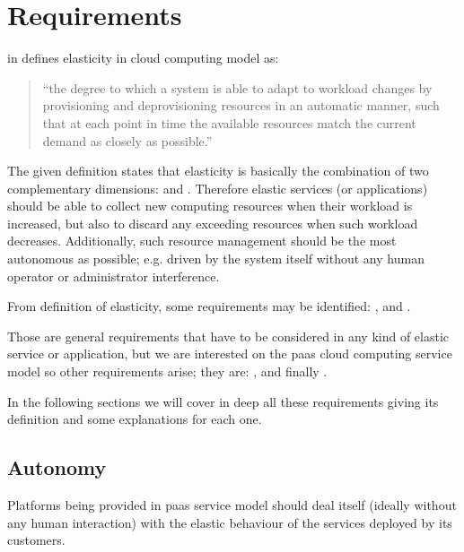 %
%
\section{Requirements}
\label{sec:elasticity-requirements}
\citeauthor{herbst2013elasticity} in \cite{herbst2013elasticity} defines elasticity in cloud computing
model as:

\begin{quote}
	``the degree to which a system is able to adapt to workload changes by provisioning and
	deprovisioning resources in an automatic manner, such that at each point in time the available resources
	match the current demand as closely as possible.''
\end{quote}

The given definition states that elasticity is basically the combination of two complementary
dimensions:  and . Therefore elastic services (or applications)
should be able to collect new computing resources when their workload is increased, but also to discard
any exceeding resources when such workload decreases. Additionally, such resource management should be
the most autonomous as possible; e.g. driven by the system itself without any human operator or
administrator interference.

From \citeauthor{herbst2013elasticity} definition of elasticity, some requirements may be
identified: ,  and .

Those are general requirements that have to be considered in any kind of elastic service or application,
but we are interested on the \ac{paas} cloud computing service model so other requirements arise;
they are: ,  and finally .

In the following sections we will cover in deep all these requirements giving its definition and
some explanations for each one.

\subsection*{Autonomy}
\label{sec:elasticity-requirements-autonomy}
Platforms being provided in \ac{paas} service model should deal itself (ideally without any human
interaction) with the elastic behaviour of the services deployed by its customers.

